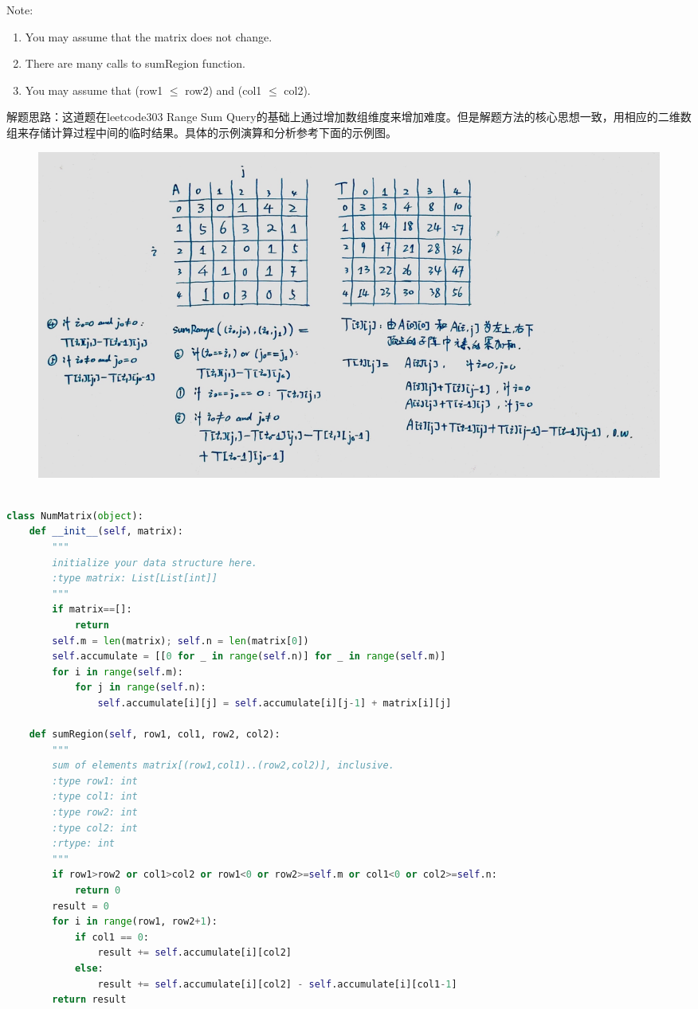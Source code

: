 \documentclass[a4paper,10pt]{article}
\begin{document}
\noindent Note: 
\begin{enumerate}
    \item You may assume that the matrix does not change. 
    \item There are many calls to sumRegion function. 
    \item You may assume that (row1 $\leq$ row2) and (col1 $\leq$ col2). \\
\end{enumerate}

\begin{CJK*}{UTF8}{gbsn}
\noindent 解题思路：这道题在leetcode303 Range Sum Query的基础上通过增加数组维度来增加难度。但是解题方法的核心思想一致，用相应的二维数组来存储计算过程中间的临时结果。具体的示例演算和分析参考下面的示例图。
\end{CJK*}

\begin{figure}[h]
\includegraphics[width=\textwidth]{leetcode304.jpg}
\centering\\
\end{figure}

\begin{lstlisting}[language=Python, caption=Problem304. Range Sum Query 2D - Immutable]

class NumMatrix(object):
    def __init__(self, matrix):
        """
        initialize your data structure here.
        :type matrix: List[List[int]]
        """
        if matrix==[]:
            return
        self.m = len(matrix); self.n = len(matrix[0])
        self.accumulate = [[0 for _ in range(self.n)] for _ in range(self.m)]
        for i in range(self.m):
            for j in range(self.n):
                self.accumulate[i][j] = self.accumulate[i][j-1] + matrix[i][j]

    def sumRegion(self, row1, col1, row2, col2):
        """
        sum of elements matrix[(row1,col1)..(row2,col2)], inclusive.
        :type row1: int
        :type col1: int
        :type row2: int
        :type col2: int
        :rtype: int
        """
        if row1>row2 or col1>col2 or row1<0 or row2>=self.m or col1<0 or col2>=self.n:
            return 0
        result = 0
        for i in range(row1, row2+1):
            if col1 == 0:
                result += self.accumulate[i][col2]
            else:
                result += self.accumulate[i][col2] - self.accumulate[i][col1-1]
        return result
\end{lstlisting}
\end{document}
